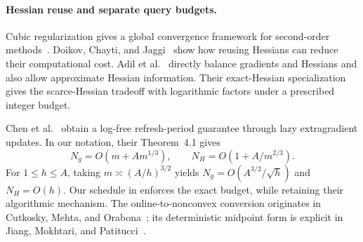 \documentclass[11pt]{article}
\theoremstyle{remark}
\theoremstyle{remark}
\begin{document}
\paragraph{Hessian reuse and separate query budgets.}
Cubic regularization gives a global convergence framework for
second-order methods~\cite{nesterov}. Doikov, Chayti, and
Jaggi~\cite{doikov} show how reusing Hessians can reduce their
computational cost. Adil et al.~\cite{adil} directly balance gradients
and Hessians and also allow approximate Hessian information.
Their exact-Hessian specialization gives the scarce-Hessian tradeoff
with logarithmic factors under a prescribed integer budget.

Chen et al.~\cite{chen} obtain a log-free refresh-period guarantee through
lazy extragradient updates. In our notation, their Theorem~4.1 gives
\begin{equation}\label{eq:chen-refresh}
 N_g=O(m+A m^{1/3}),\qquad
 N_H=O(1+A/m^{2/3}).
\end{equation}
For $1\le h\le A$, taking $m\asymp(A/h)^{3/2}$ yields
$N_g=O(A^{3/2}/\sqrt h)$ and $N_H=O(h)$. Our schedule in
 enforces the exact budget, while retaining their
algorithmic mechanism. The online-to-nonconvex conversion originates in
Cutkosky, Mehta, and Orabona~\cite{cutkosky}; its deterministic midpoint
form is explicit in Jiang, Mokhtari, and Patitucci~\cite{jiang}.
\end{document}
